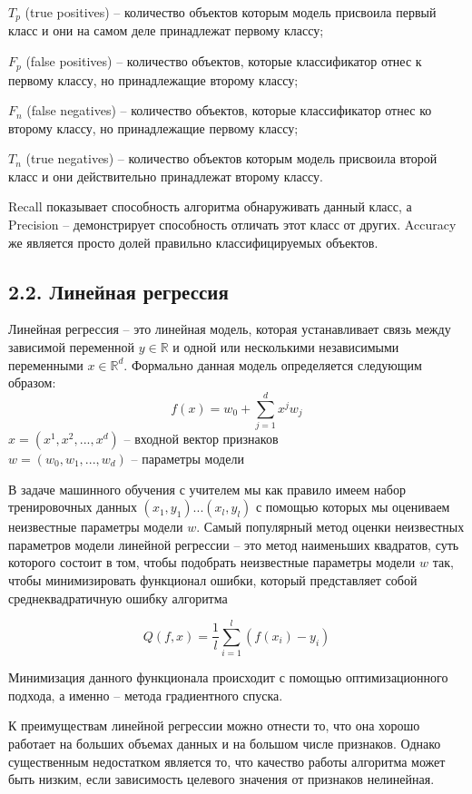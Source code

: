 $T_p$ (true positives) -- количество объектов которым модель присвоила первый класс и они на самом деле принадлежат первому классу; 

$F_p$ (false positives) -- количество объектов, которые классификатор отнес к первому классу, но  принадлежащие второму классу;

$F_n$ (false negatives) -- количество объектов, которые классификатор отнес ко второму классу, но принадлежащие первому классу;

$T_n$ (true negatives) -- количество объектов которым модель присвоила второй класс и они действительно принадлежат второму классу.

 
 Recall показывает способность алгоритма обнаруживать данный класс, а Precision --  демонстрирует способность отличать этот класс от других. Accuracy же является просто долей правильно классифицируемых объектов.
 

\subsection{2.2. Линейная регрессия}

Линейная регрессия \cite{linear regression} -- это линейная модель, которая устанавливает связь между зависимой переменной $y \in \mathbb{R}$ и одной или несколькими независимыми переменными $x \in \mathbb{R}^d$. Формально данная модель определяется следующим образом:
$$f(x)=w_0 + \sum_{j=1}^{d}x^j w_j$$
$x = (x^1, x^2, ..., x^d)$ -- входной вектор признаков \\
$w = (w_0, w_1, ... ,w_d)$ -- параметры модели

В задаче машинного обучения с учителем мы как правило имеем набор тренировочных данных $(x_1, y_1) ... (x_l,  y_l)$ с помощью которых мы оцениваем неизвестные параметры модели $w$. Самый популярный метод оценки неизвестных параметров модели линейной регрессии -- это метод наименьших квадратов, суть которого состоит в том, чтобы подобрать неизвестные параметры модели $w$ так, чтобы минимизировать функционал ошибки, который представляет собой среднеквадратичную ошибку алгоритма

\begin{equation}\label{linreg functional}
Q(f, x) = \frac{1}{l}\sum_{i=1}^{l} (f(x_i) - y_i)
\end{equation}

Минимизация данного функционала происходит с помощью оптимизационного подхода, а именно -- метода градиентного спуска.

К преимуществам линейной регрессии можно отнести то, что она хорошо работает на больших объемах данных и на большом числе признаков. Однако существенным недостатком  является то, что качество работы алгоритма может быть низким, если зависимость целевого значения от признаков нелинейная. 


